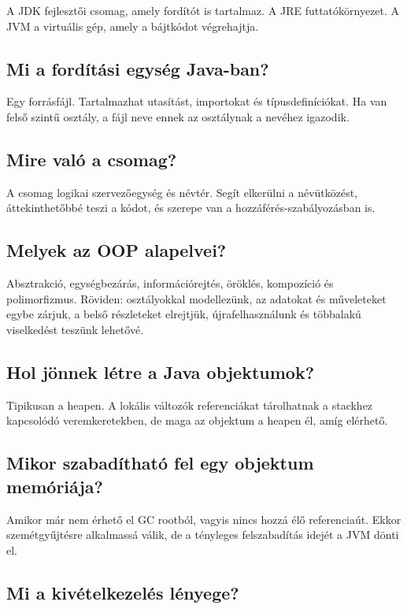 A JDK fejlesztői csomag, amely fordítót is tartalmaz. A JRE futtatókörnyezet. A JVM a virtuális gép, amely a bájtkódot végrehajtja.

\subsection{Mi a fordítási egység Java-ban?}

Egy  forrásfájl. Tartalmazhat  utasítást, importokat és típusdefiníciókat. Ha van  felső szintű osztály, a fájl neve ennek az osztálynak a nevéhez igazodik.

\subsection{Mire való a csomag?}

A csomag logikai szervezőegység és névtér. Segít elkerülni a névütközést, áttekinthetőbbé teszi a kódot, és szerepe van a hozzáférés-szabályozásban is.

\subsection{Melyek az OOP alapelvei?}

Absztrakció, egységbezárás, információrejtés, öröklés, kompozíció és polimorfizmus. Röviden: osztályokkal modellezünk, az adatokat és műveleteket egybe zárjuk, a belső részleteket elrejtjük, újrafelhasználunk és többalakú viselkedést teszünk lehetővé.

\subsection{Hol jönnek létre a Java objektumok?}

Tipikusan a heapen. A lokális változók referenciákat tárolhatnak a stackhez kapcsolódó veremkeretekben, de maga az objektum a heapen él, amíg elérhető.

\subsection{Mikor szabadítható fel egy objektum memóriája?}

Amikor már nem érhető el GC rootból, vagyis nincs hozzá élő referenciaút. Ekkor szemétgyűjtésre alkalmassá válik, de a tényleges felszabadítás idejét a JVM dönti el.

\subsection{Mi a kivételkezelés lényege?}

